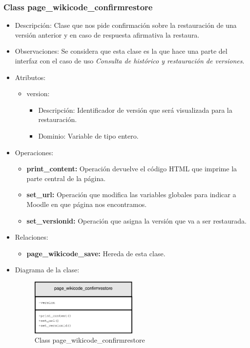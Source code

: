 \subsubsection{Class page\_wikicode\_confirmrestore}

\begin{itemize}
	\item Descripción: Clase que nos pide confirmación sobre la restauración de una versión anterior y en caso de respuesta afirmativa la restaura.
	\item Observaciones: Se considera que esta clase es la que hace una parte del interfaz con el caso de uso \emph{Consulta de histórico y restauración de versiones}.
	\item Atributos:
		\begin{itemize}
			\item version:
				\begin{itemize}
					\item Descripción: Identificador de versión que será visualizada para la restauración.
					\item Dominio: Variable de tipo entero.
				\end{itemize}
		\end{itemize}
	\item Operaciones:
		\begin{itemize}
			\item \textbf{print\_content: }Operación devuelve el código HTML que imprime la parte central de la página.
			\item \textbf{set\_url: }Operación que modifica las variables globales para indicar a Moodle en que página nos encontramos.
			\item \textbf{set\_versionid: }Operación que asigna la versión que va a ser restaurada.
		\end{itemize}
	\item Relaciones:
		\begin{itemize}
			\item \textbf{page\_wikicode\_save:} Hereda de esta clase.
		\end{itemize}
	\item Diagrama de la clase:
		\begin{figure}[h]
			\centering
			\includegraphics[width=0.5\textwidth]{./img/page_wikicode_confirmrestore.eps}
			\caption{Class page\_wikicode\_confirmrestore}
		\end{figure}
\end{itemize}

